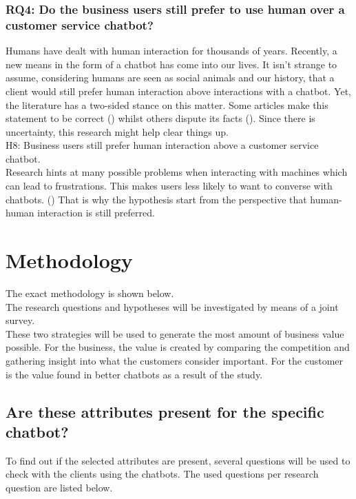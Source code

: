 \subsubsection{RQ4: Do the business users still prefer to use human over a customer service chatbot?}
Humans have dealt with human interaction for thousands of years. Recently, a new means in the form of a chatbot has come into our lives. It isn’t strange to assume, considering humans are seen as social animals and our history, that a client would still prefer human interaction above interactions with a chatbot. Yet, the literature has a two-sided stance on this matter. Some articles make this statement to be correct (\cite{Ashfaq2020}) whilst others dispute its facts (\cite{Muizzah2021, Radziwil2021}). Since there is uncertainty, this research might help clear things up.\\
\break
H8: Business users still prefer human interaction above a customer service chatbot.\\
\break
Research hints at many possible problems when interacting with machines which can lead to frustrations. This makes users less likely to want to converse with chatbots. (\cite{Ashfaq2020, brandtzaeg2020, Goot2020}) That is why the hypothesis start from the perspective that human-human interaction is still preferred.

\section{Methodology}
The exact methodology is shown below.\\
\break
The research questions and hypotheses will be investigated by means of a joint survey.\\
\break
These two strategies will be used to generate the most amount of business value possible. For the business, the value is created by comparing the competition and gathering insight into what the customers consider important. For the customer is the value found in better chatbots as a result of the study.\\

\subsection{Are these attributes present for the specific chatbot?}
To find out if the selected attributes are present, several questions will be used to check with the clients using the chatbots. The used questions per research question are listed below.

